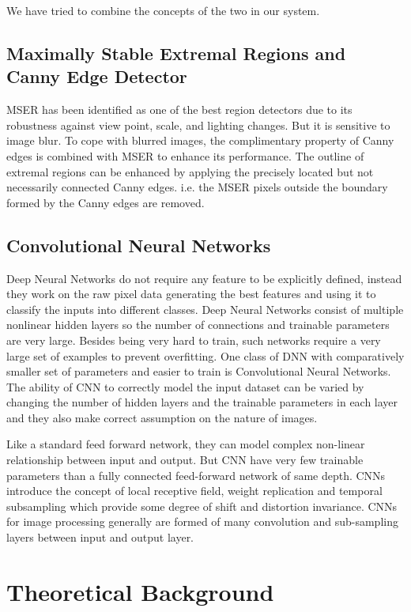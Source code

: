 We have tried to combine the concepts of the two in our system. 
    \section{Maximally Stable Extremal Regions and Canny Edge Detector}
    
MSER has been identified as one of the best region detectors due to its robustness against view point, scale, and lighting changes. But it is sensitive to image blur. To cope with blurred images, the complimentary property of Canny edges is combined with MSER to enhance its performance. The outline of extremal regions can be enhanced by applying the precisely located but not necessarily connected Canny edges. i.e. the MSER pixels outside the boundary formed by the Canny edges are removed.

    \section{Convolutional Neural Networks}
Deep Neural Networks do not require any feature to be explicitly defined, instead they work on the raw pixel data generating the best features and using it to classify the inputs into different classes. Deep Neural Networks consist of multiple nonlinear hidden layers so the number of connections and trainable parameters are very large. Besides being very hard to train, such networks require a very large set of examples to prevent overfitting. One class of DNN with comparatively smaller set of parameters and easier to train is Convolutional Neural Networks. The ability of CNN to correctly model the input dataset can be varied by changing the number of hidden layers and the trainable parameters in each layer and they also make correct assumption on the nature of images. 

Like a standard feed forward network, they can model complex non-linear relationship between input and output. But CNN have very few trainable parameters than a fully connected feed-forward network of same depth. CNNs introduce the concept of local receptive field, weight replication and temporal subsampling which provide some degree of shift and distortion invariance. CNNs for image processing generally are formed of many convolution and sub-sampling layers between input and output layer.


\chapter{Theoretical Background}
